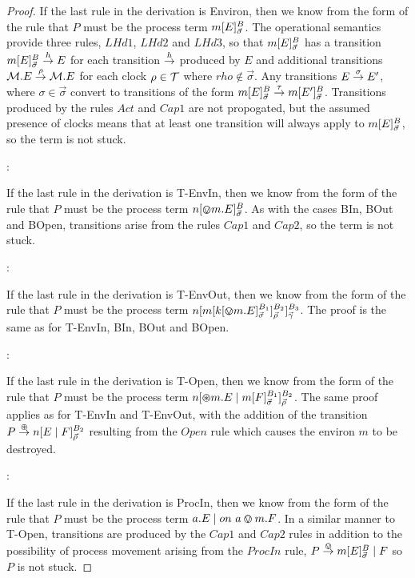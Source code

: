 \begin{proof}
\noindent If the last rule in the derivation is Environ, then we know
from the form of the rule that $P$ must be the process term
${m}[ E ]^{B}_{\vec{\sigma}}$.  The operational semantics provide
three rules, $LHd1$, $LHd2$ and $LHd3$, so that
${m}[ E ]^{B}_{\vec{\sigma}}$ has a transition
${m}[ E ]^{B}_{\vec{\sigma}} \stackrel{h}{\rightarrow} E$ for each transition
$\stackrel{h}{\rightarrow}$ produced by $E$ and additional transitions $\text{$\mathcal{M}$}.E
\stackrel{\rho}{\rightarrow} \text{$\mathcal{M}$}.E$ for each clock $\rho \in \text{$\mathcal{T}$}$ where $rho
\not \in \vec{\sigma}$.  Any transitions $E \stackrel{\sigma}{\rightarrow} E'$,
where $\sigma \in \vec{\sigma}$ convert to transitions of the form
${m}[ E ]^{B}_{\vec{\sigma}} \stackrel{\tau}{\rightarrow}
{m}[ E' ]^{B}_{\vec{\sigma}}$.  Transitions produced by the rules
$Act$ and $Cap1$ are not propogated, but the assumed presence of
clocks means that at least one transition will always apply to
${m}[ E ]^{B}_{\vec{\sigma}}$, so the term is not stuck.

:

\noindent If the last rule in the derivation is T-EnvIn, then we know
from the form of the rule that $P$ must be the process term
${n}[ \varovee m.E ]^{B}_{\vec{\sigma}}$.  As with the cases BIn, BOut
and BOpen, transitions arise from the rules $Cap1$ and $Cap2$, so the
term is not stuck.

:

\noindent If the last rule in the derivation is T-EnvOut, then we know
from the form of the rule that $P$ must be the process term
${n}[ {m}[ {k}[ \varovee m.E ]^{B_1}_{\vec{\sigma}} ]^{B_2}_{\vec{\rho}} ]^{B_3}_{\vec{\gamma}}$.
The proof is the same as for T-EnvIn, BIn, BOut and BOpen.

:

\noindent If the last rule in the derivation is T-Open, then we know
from the form of the rule that $P$ must be the process term
${n}[ \varoast m.E \;|\;
  {m}[ F ]^{B_1}_{\vec{\sigma}} ]^{B_2}_{\vec{\rho}}$.  The same proof
applies as for T-EnvIn and T-EnvOut, with the addition of the
transition $P \stackrel{\varoast}{\rightarrow} {n}[ E \;|\; F ]^{B_2}_{\vec{\rho}}$
resulting from the $Open$ rule which causes the environ $m$ to be
destroyed.

:

\noindent If the last rule in the derivation is ProcIn, then we know
from the form of the rule that $P$ must be the process term $a.E \;|\;
on\ a \varovee m.F$.  In a similar manner to T-Open, transitions are
produced by the $Cap1$ and $Cap2$ rules in addition to the possibility
of process movement arising from the $ProcIn$ rule, $P \stackrel{\varovee}{\rightarrow}
{m}[ E ]^{B}_{\vec{\sigma}} \;|\; F$ so $P$ is not stuck.


\end{proof}
